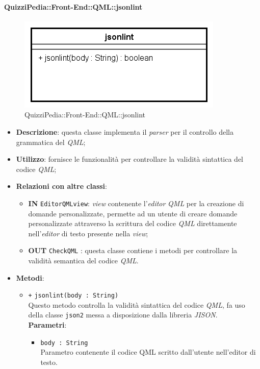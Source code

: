 \paragraph[QuizziPedia::Front-End::QML::jsonlint]{QuizziPedia::Front-End::QML::jsonlint}
\begin{figure} [ht]
	\centering
	\includegraphics[scale=0.80]{UML/Classi/Front-End/QuizziPedia_Front-end_QML_jsonlint.png}
	\caption{QuizziPedia::Front-End::QML::jsonlint}
\end{figure} \FloatBarrier
\begin{itemize}
	\item \textbf{Descrizione}: questa classe implementa il \textit{parser} per il controllo della grammatica del \textit{QML};
	\item \textbf{Utilizzo}: fornisce le funzionalità per controllare la validità sintattica del codice \textit{QML};
	\item \textbf{Relazioni con altre classi}:
	\begin{itemize}
		\item \textbf{IN} \texttt{EditorQMLview}: \textit{view} contenente l'\textit{editor} \textit{QML} per la creazione di domande personalizzate,
		permette ad un utente di creare domande personalizzate attraverso la scrittura del codice \textit{QML} direttamente nell'\textit{editor} di testo presente nella \textit{view};
		\item \textbf{OUT} \texttt{CheckQML} : questa classe contiene i metodi per controllare la validità semantica del codice \textit{QML}.
	\end{itemize}
	\item \textbf{Metodi}:
	\begin{itemize}
		\item \texttt{+} \texttt{jsonlint(body : String)} \\ 
		Questo metodo controlla la validità sintattica del codice \textit{QML}, fa uso della classe \texttt{json2} messa a disposizione dalla libreria \textit{JISON}. \\
		\textbf{Parametri}:
		\begin{itemize}
			\item \texttt{body : String} \\
			Parametro contenente il codice QML scritto dall'utente nell'editor di testo.
		\end{itemize}
	\end{itemize}
\end{itemize}

